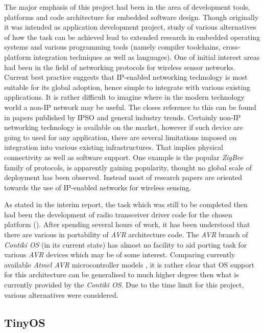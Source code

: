 

  The major emphasis of this project had been in the area of development
 tools, platforms and code architecture for embedded software design.
 Though originally it was intended as application development project,
 study of various alternatives of how the task can be achieved lead to
 extended research in embedded operating systems and various programming
 tools (namely compiler toolchains, cross-platform integration techniques
 as well as languages).
  One of initial interest areas had been in the field of networking protocols
 for wireless sensor networks. Current best practice suggests that IP-enabled
 networking technology is most suitable for its global adoption, hence simple
 to integrate with various existing applications. It is rather difficult to
 imagine where in the modern technology world a non-IP network may be useful.
 The closes reference to this can be found in papers published by IPSO 
 \cite{IPSO_PAPERS} and general industry trends. Certainly non-IP networking
 technology is available on the market, however if such device are going to
 used for any application, there are several limitations imposed on integration
 into various existing infrastructures. That implies physical connectivity
 as well as software support. One example is the popular \emph{ZigBee}
 family of protocols, is apparently gaining popularity, thought no global
 scale of deployment has been observed. Instead most of research papers
 are oriented towards the use of IP-enabled networks for wireless sensing.


  As stated in the interim report, the task which was still to be
 completed then had been the development of radio transceiver driver
 code for the chosen platform (). After spending
 several hours of work, it has been understood that there are various
 in portability of \emph{AVR} architecture code. The \emph{AVR} branch
 of \emph{Contiki OS} (in its current state) has almost no facility to
 aid porting task for various \emph{AVR} devices which may be of some
 interest. Comparing currently available \emph{Atmel AVR} microcontroller
 models \cite{atmel:avr:table}, it is rather clear that OS support for
 this architecture can be generalised to much higher degree then what is
 currently provided by the \emph{Contiki OS}. Due to the time limit for
 this project, various alternatives were considered.

\subsection{TinyOS}

